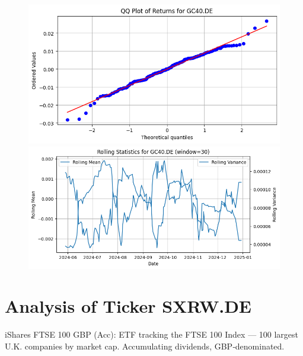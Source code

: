 \documentclass{article}%
\begin{document}
%


\begin{figure}[htbp]%
\begin{minipage}{0.31\textwidth}%
\includegraphics[width=\linewidth]{ticker_images/GC40.DE_qq_plot.png}%
\end{minipage}%
\begin{minipage}{0.31\textwidth}%
\includegraphics[width=\linewidth]{ticker_images/GC40.DE_rolling_stats.png}%
\end{minipage}%
\end{figure}

%
\section*{Analysis of Ticker SXRW.DE}%
\label{sec:AnalysisofTickerSXRW.DE}%
iShares FTSE 100 GBP (Acc): ETF tracking the FTSE 100 Index — 100 largest U.K. companies by market cap. Accumulating dividends, GBP‑denominated.%
\end{document}

